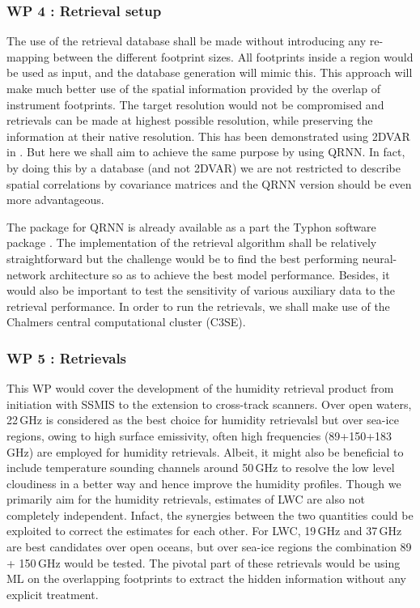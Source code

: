 \documentclass[12pt,oneside,a4paper]{article}
\begin{document}
\subsubsection*{WP 4 : Retrieval setup}
%
\label{sec:setup}
The use of the retrieval database shall be made without introducing any re-mapping between the different footprint sizes. All footprints inside a region would be used as input, and the database generation will mimic this. This approach will make much better use of the spatial information provided by the overlap of instrument footprints. The target resolution would not be compromised and retrievals can be made at highest possible resolution, while preserving the information at their native resolution. This has been demonstrated using 2DVAR in \citep{duncan:onthe:19}. But here we shall aim to achieve the same purpose by using QRNN. In fact, by doing this by a database (and not 2DVAR) we are not restricted to describe spatial correlations by covariance matrices and the QRNN version should be even more advantageous.

The package for QRNN is already available as a part the Typhon software package \citep{lemke:2020:typhon}. The implementation of the retrieval algorithm shall be relatively straightforward but the challenge would be to find the best performing neural-network architecture so as to achieve the best model performance. Besides, it would also be important to test the sensitivity of various auxiliary data to the retrieval performance. In order to run the retrievals, we shall make use of the Chalmers central computational cluster (C3SE).


\subsubsection*{WP 5 : Retrievals}
%
\label{sec:retrievals}
%
This WP would cover the development of the humidity retrieval product from initiation with SSMIS to the extension to cross-track scanners. Over open waters, 22\,GHz is considered as the best choice for humidity retrievalsl but over sea-ice regions, owing to high surface emissivity, often high frequencies (89+150+183\,GHz) are employed for humidity retrievals. Albeit, it might also be beneficial to include temperature sounding channels around 50\,GHz to resolve the low level cloudiness in a better way and hence improve the humidity profiles. Though we primarily aim for the humidity retrievals, estimates of LWC are also not completely independent. Infact, the synergies between the two quantities could be exploited to correct the estimates for each other. For LWC, 19\,GHz and 37\,GHz are best candidates over open oceans, but over sea-ice regions the combination 89 + 150\,GHz would be tested. The pivotal part of these retrievals would be using ML on the overlapping footprints to extract the hidden information without any explicit treatment. 
\end{document}
